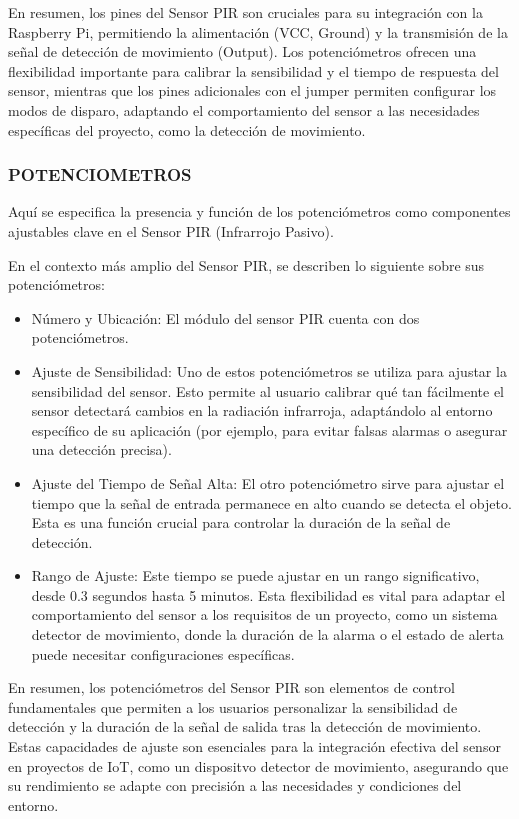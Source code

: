\documentclass{report}
\begin{document}
En resumen, los pines del Sensor PIR son cruciales para su integración con la Raspberry Pi, permitiendo la alimentación (VCC, Ground) y la transmisión 
de la señal de detección de movimiento (Output). Los potenciómetros ofrecen una flexibilidad importante para calibrar la sensibilidad y el tiempo de 
respuesta del sensor, mientras que los pines adicionales con el jumper permiten configurar los modos de disparo, adaptando el comportamiento del sensor 
a las necesidades específicas del proyecto, como la detección de movimiento.

\subsubsection{POTENCIOMETROS}
Aquí se especifica la presencia y función de los potenciómetros como componentes ajustables clave en 
el Sensor PIR (Infrarrojo Pasivo).

En el contexto más amplio del Sensor PIR, se  describen lo siguiente sobre sus potenciómetros:
\begin{itemize}
    \item Número y Ubicación: El módulo del sensor PIR cuenta con dos potenciómetros.
    \item Ajuste de Sensibilidad: Uno de estos potenciómetros se utiliza para ajustar la sensibilidad del sensor. Esto permite al usuario calibrar 
    qué tan fácilmente el sensor detectará cambios en la radiación infrarroja, adaptándolo al entorno específico de su aplicación (por ejemplo, 
    para evitar falsas alarmas o asegurar una detección precisa).
    \item Ajuste del Tiempo de Señal Alta: El otro potenciómetro sirve para ajustar el tiempo que la señal de entrada permanece en alto cuando se detecta 
    el objeto. Esta es una función crucial para controlar la duración de la señal de detección.
    \item Rango de Ajuste: Este tiempo se puede ajustar en un rango significativo, desde 0.3 segundos hasta 5 minutos. Esta flexibilidad es vital para 
    adaptar el comportamiento del sensor a los requisitos de un proyecto, como un sistema detector de movimiento, donde la duración de 
    la alarma o el estado de alerta puede necesitar configuraciones específicas.
\end{itemize}

En resumen, los potenciómetros del Sensor PIR son elementos de control fundamentales que permiten a los usuarios personalizar la sensibilidad de detección 
y la duración de la señal de salida tras la detección de movimiento. Estas capacidades de ajuste son esenciales para la integración efectiva del sensor 
en proyectos de IoT, como un dispositvo detector de movimiento, asegurando que su rendimiento se adapte con precisión a 
las necesidades y condiciones del entorno.
\end{document}
